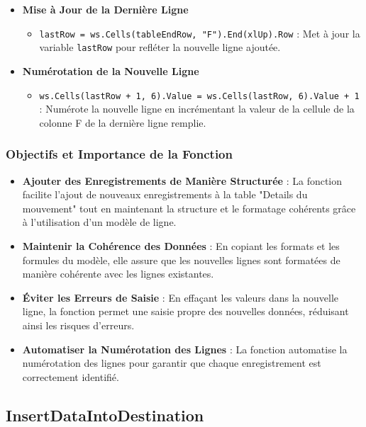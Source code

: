 \documentclass[a4paper, oneside, 12pt, final]{extreport}
\begin{document}
\begin{itemize}
\item\textbf{Mise à Jour de la Dernière Ligne}

\begin{itemize}
    \item \texttt{lastRow = ws.Cells(tableEndRow, "F").End(xlUp).Row} : Met à jour la variable \texttt{lastRow} pour refléter la nouvelle ligne ajoutée.
\end{itemize}

\item\textbf{Numérotation de la Nouvelle Ligne}

\begin{itemize}
    \item \texttt{ws.Cells(lastRow + 1, 6).Value = ws.Cells(lastRow, 6).Value + 1} : Numérote la nouvelle ligne en incrémentant la valeur de la cellule de la colonne F de la dernière ligne remplie.
\end{itemize}
\end{itemize}

\subsubsection{Objectifs et Importance de la Fonction}

\begin{itemize}
    \item \textbf{Ajouter des Enregistrements de Manière Structurée} : La fonction facilite l'ajout de nouveaux enregistrements à la table "Details du mouvement" tout en maintenant la structure et le formatage cohérents grâce à l'utilisation d'un modèle de ligne.
    \item \textbf{Maintenir la Cohérence des Données} : En copiant les formats et les formules du modèle, elle assure que les nouvelles lignes sont formatées de manière cohérente avec les lignes existantes.
    \item \textbf{Éviter les Erreurs de Saisie} : En effaçant les valeurs dans la nouvelle ligne, la fonction permet une saisie propre des nouvelles données, réduisant ainsi les risques d'erreurs.
    \item \textbf{Automatiser la Numérotation des Lignes} : La fonction automatise la numérotation des lignes pour garantir que chaque enregistrement est correctement identifié.
\end{itemize}
\subsection{InsertDataIntoDestination}
\end{document}

